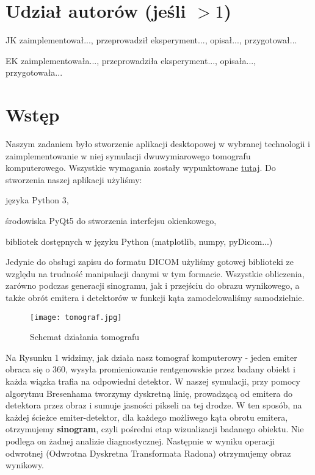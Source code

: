 \documentclass{article}
\begin{document}


\section*{Udział autorów (jeśli $>1$)}
\begin{tightlist}
\item JK zaimplementował..., przeprowadził eksperyment..., opisał..., przygotował...
\item EK zaimplementowała..., przeprowadziła eksperyment..., opisała..., przygotowała...
\end{tightlist}



\section{Wstęp}

Naszym zadaniem było stworzenie aplikacji desktopowej w wybranej technologii i zaimplementowanie w niej symulacji dwuwymiarowego tomografu komputerowego. Wszystkie wymagania zostały wypunktowane \href{https://www.cs.put.poznan.pl/ibladek/students/iwm/0_projekt_wspolny_Tomograf.pdf}{tutaj}. Do stworzenia naszej aplikacji użyliśmy:
\begin{tightlist}
\item języka Python 3,
\item środowiska PyQt5 do stworzenia interfejsu okienkowego,
\item bibliotek dostępnych w języku Python (matplotlib, numpy, pyDicom...)
\end{tightlist}

Jedynie do obsługi zapisu do formatu DICOM użyliśmy gotowej biblioteki ze względu na trudność manipulacji danymi w tym formacie. Wszystkie obliczenia, zarówno podczas generacji sinogramu, jak i przejściu do obrazu wynikowego, a także obrót emitera i detektorów w funkcji kąta zamodelowaliśmy samodzielnie.

\begin{figure}[!htbp]
\begin{center}
\texttt{[image: tomograf.jpg]}
\end{center}
\caption{Schemat działania tomografu}
\label{fig:1Tdelta}
\end{figure}

Na Rysunku 1 widzimy, jak działa nasz tomograf komputerowy - jeden emiter obraca się o 360\degree, wysyła promieniowanie rentgenowskie przez badany obiekt i każda wiązka trafia na odpowiedni detektor. W naszej symulacji, przy pomocy algorytmu Bresenhama tworzymy dyskretną linię, prowadzącą od emitera do detektora przez obraz i sumuje jasności pikseli na tej drodze. W ten sposób, na każdej ścieżce emiter-detektor, dla każdego możliwego kąta obrotu emitera, otrzymujemy \textbf{sinogram}, czyli pośredni etap wizualizacji badanego obiektu. Nie podlega on żadnej analizie diagnostycznej. Następnie w wyniku operacji odwrotnej (Odwrotna Dyskretna Transformata Radona) otrzymujemy obraz wynikowy. 
\end{document}

